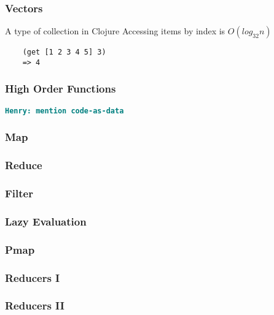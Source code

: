 \documentclass{beamer}
\newcommand{\comment}[1]{{\bf \tt  {#1}}}
\newcommand{\hfcomment}[1]{\textcolor{Teal}{\comment{Henry: {#1}}}}
\begin{document}
\begin{frame}[fragile]
\frametitle{Vectors}
A type of collection in Clojure
Accessing items by index is $O(log_{32}n)$
	\begin{verbatim}
	(get [1 2 3 4 5] 3)	
	=> 4
	\end{verbatim}
\end{frame}

\begin{frame}[fragile]
\frametitle{High Order Functions}
\hfcomment{mention code-as-data}
\end{frame}

\begin{frame}[fragile]
\frametitle{Map}
\end{frame}

\begin{frame}[fragile]
\frametitle{Reduce}
\end{frame}

\begin{frame}[fragile]
\frametitle{Filter}
\end{frame}

\begin{frame}[fragile]
\frametitle{Lazy Evaluation}
\end{frame}

\begin{frame}[fragile]
\frametitle{Pmap}
\end{frame}

\begin{frame}[fragile]
\frametitle{Reducers I}
\end{frame}

\begin{frame}[fragile]
\frametitle{Reducers II}
\end{frame}
\end{document}
